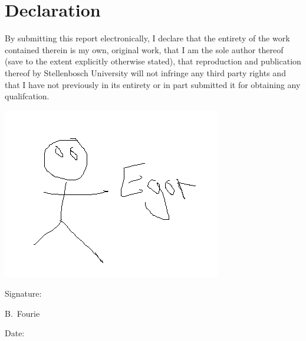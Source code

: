 \chapter{Declaration}

By submitting this report electronically, I declare that the entirety of the work contained
therein is my own, original work, that I am the sole author thereof (save to the extent
explicitly otherwise stated), that reproduction and publication thereof by Stellenbosch
University will not infringe any third party rights and that I have not previously in its
entirety or in part submitted it for obtaining any qualifcation.

\vspace{3cm}

\includegraphics{./Figures/Signature.png}\\
\noindent%
\parbox{.5\textwidth}{%
  Signature:\quad\dotfill\par
  \hfill B.\ Fourie\hspace{1.2cm}\null}


\vspace{1.5cm}
\noindent%
\parbox{.5\textwidth}{%
  Date:\quad\dotfill\par}
